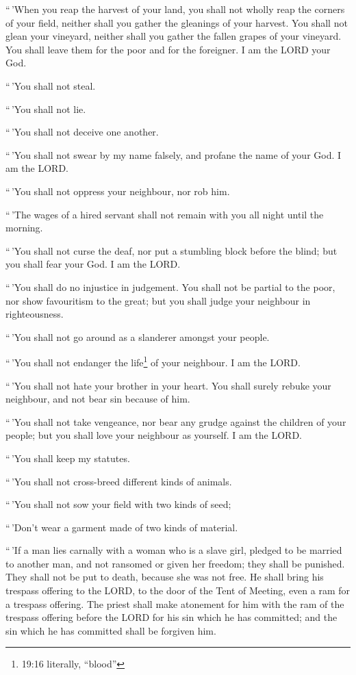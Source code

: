  ``\,'When you reap the harvest of your land, you shall not
wholly reap the corners of your field, neither shall you gather the
gleanings of your harvest.  You shall not glean your
vineyard, neither shall you gather the fallen grapes of your vineyard.
You shall leave them for the poor and for the foreigner. I am the LORD
your God.

 ``\,'You shall not steal.

``\,'You shall not lie.

``\,'You shall not deceive one another.

 ``\,'You shall not swear by my name falsely, and profane
the name of your God. I am the LORD.

 ``\,'You shall not oppress your neighbour, nor rob him.

``\,'The wages of a hired servant shall not remain with you all night
until the morning.

 ``\,'You shall not curse the deaf, nor put a stumbling
block before the blind; but you shall fear your God. I am the LORD.

 ``\,'You shall do no injustice in judgement. You shall not
be partial to the poor, nor show favouritism to the great; but you shall
judge your neighbour in righteousness.

 ``\,'You shall not go around as a slanderer amongst your
people.

``\,'You shall not endanger the life\footnote{19:16 literally, ``blood''}
of your neighbour. I am the LORD.

 ``\,'You shall not hate your brother in your heart. You
shall surely rebuke your neighbour, and not bear sin because of him.

 ``\,'You shall not take vengeance, nor bear any grudge
against the children of your people; but you shall love your neighbour
as yourself. I am the LORD.

 ``\,'You shall keep my statutes.

``\,'You shall not cross-breed different kinds of animals.

``\,'You shall not sow your field with two kinds of seed;

``\,'Don't wear a garment made of two kinds of material.

 ``\,'If a man lies carnally with a woman who is a slave
girl, pledged to be married to another man, and not ransomed or given
her freedom; they shall be punished. They shall not be put to death,
because she was not free.  He shall bring his trespass
offering to the LORD, to the door of the Tent of Meeting, even a ram for
a trespass offering.  The priest shall make atonement for
him with the ram of the trespass offering before the LORD for his sin
which he has committed; and the sin which he has committed shall be
forgiven him.

